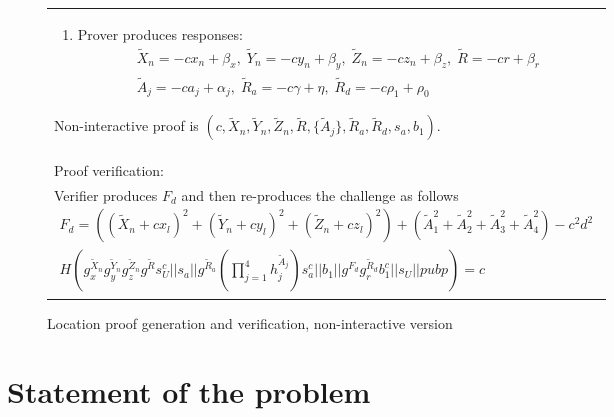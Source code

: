 \documentclass{article}
\begin{document}
\begin{figure}[!htb]
\begin{tabular}{|p{\linewidth}|}
\begin{enumerate}
\item
  Prover produces responses:
\begin{multline}
  \tilde X_n = -c x_n + \beta_x,  \;
  \tilde Y_n = -c y_n + \beta_y,  \;
  \tilde Z_n = -c z_n + \beta_z,   \;
  \tilde R = -c r + \beta_r   \\
  \tilde A_j = -c a_j + \alpha_j, \;
  \tilde R_a = -c \gamma + \eta,   \;
  \tilde R_d = -c \rho_1 + \rho_0
\end{multline}
\end{enumerate}
Non-interactive proof is
$(c, \tilde X_n, \tilde Y_n, \tilde Z_n, \tilde R, \{\tilde A_j\}, \tilde R_a, \tilde R_d, s_a, b_1)$.
\\
Proof verification:\\
Verifier produces $F_d$ and then re-produces the challenge as follows
%
\begin{multline}
\label{verf-chash}
  F_d = ((\tilde X_n + c x_l)^2 + (\tilde Y_n + c y_l)^2 + (\tilde Z_n + c z_l)^2) + (\tilde A_1^2 + \tilde A_2^2 + \tilde A_3^2 + \tilde A_4^2) - c^2 d^2 \\
  H(g_x^{\tilde X_n} g_y^{\tilde Y_n} g_z^{\tilde Z_n} g^{\tilde R} s_U^{c} ||
    s_a ||
    g^{\tilde R_a} (\prod_{j=1}^4 h_j^{\tilde A_j}) s_a^{c} ||
    b_1 ||
    g^{F_d} g_r^{\tilde R_d} b_1^c ||
    s_U ||
    pubp)
  = c
\end{multline}
\\
\hline
\end{tabular}
\caption{Location proof generation and verification, non-interactive version}
\label{ni_fig}
\end{figure}

\section{Statement of the problem}
\end{document}
